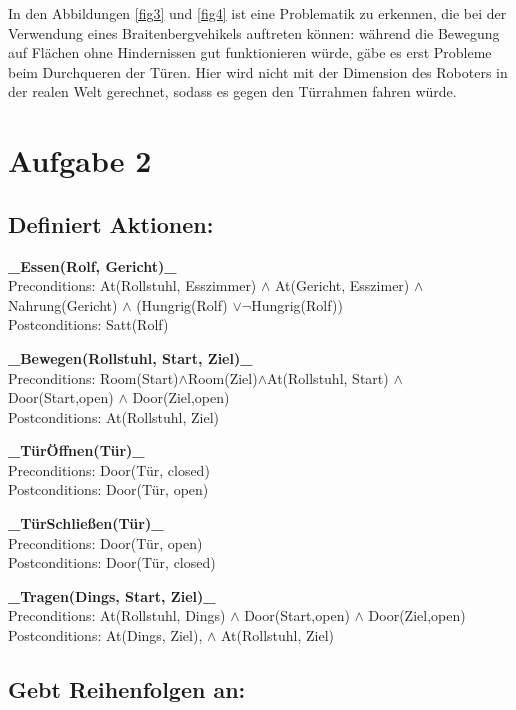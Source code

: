 \documentclass{../Vorlage/mat}
\begin{document}
In den  Abbildungen \ref{fig3} und \ref{fig4} ist eine Problematik zu erkennen, die bei der Verwendung eines Braitenbergvehikels auftreten können: während die Bewegung auf Flächen ohne Hindernissen gut funktionieren würde, gäbe es erst Probleme beim Durchqueren der Türen. Hier wird nicht mit der Dimension des Roboters in der realen Welt gerechnet, sodass es gegen den Türrahmen fahren würde.
\newpage

\section*{Aufgabe 2}
\subsection*{Definiert Aktionen:}
\textbf{\_Essen(Rolf, Gericht)\_}\\
Preconditions: At(Rollstuhl, Esszimmer) $\wedge$ At(Gericht, Esszimer) $\wedge$ Nahrung(Gericht) $\wedge$ (Hungrig(Rolf) $\vee \neg$Hungrig(Rolf))\\
Postconditions: Satt(Rolf)


\textbf{\_Bewegen(Rollstuhl, Start, Ziel)\_}\\
Preconditions: Room(Start)$\wedge$Room(Ziel)$\wedge$At(Rollstuhl, Start) $\wedge$  Door(Start,open) $\wedge$ Door(Ziel,open)\\
Postconditions: At(Rollstuhl, Ziel)


\textbf{\_TürÖffnen(Tür)\_}\\
Preconditions: Door(Tür, closed)\\
Postconditions: Door(Tür, open)


\textbf{\_TürSchließen(Tür)\_}\\
Preconditions: Door(Tür, open)\\
Postconditions: Door(Tür, closed)


\textbf{\_Tragen(Dings, Start, Ziel)\_}\\
Preconditions: At(Rollstuhl, Dings) $\wedge$  Door(Start,open) $\wedge$ Door(Ziel,open)\\
Postconditions: At(Dings, Ziel), $\wedge$ At(Rollstuhl, Ziel)

\subsection*{Gebt Reihenfolgen an:}
\end{document}
